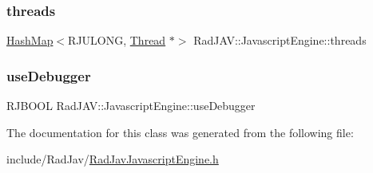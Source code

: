 \mbox{\label{class_rad_j_a_v_1_1_javascript_engine_a5ed20d1c0b0bfa1608b5991c71dfd5e9}} 
\subsubsection{\texorpdfstring{threads}{threads}}
{\footnotesize\ttfamily \mbox{\hyperlink{namespace_rad_j_a_v_a7c83af3095bdd8035fd71ff008120f08}{Hash\+Map}}$<$R\+J\+U\+L\+O\+NG, \mbox{\hyperlink{class_rad_j_a_v_1_1_thread}{Thread}} $\ast$$>$ Rad\+J\+A\+V\+::\+Javascript\+Engine\+::threads\hspace{0.3cm}{\ttfamily [protected]}}

\mbox{\label{class_rad_j_a_v_1_1_javascript_engine_a64acee3048eba4322c648cad00bc200e}} 
\subsubsection{\texorpdfstring{use\+Debugger}{useDebugger}}
{\footnotesize\ttfamily R\+J\+B\+O\+OL Rad\+J\+A\+V\+::\+Javascript\+Engine\+::use\+Debugger\hspace{0.3cm}{\ttfamily [protected]}}



The documentation for this class was generated from the following file\+:\begin{DoxyCompactItemize}
\item 
include/\+Rad\+Jav/\mbox{\hyperlink{_rad_jav_javascript_engine_8h}{Rad\+Jav\+Javascript\+Engine.\+h}}\end{DoxyCompactItemize}
